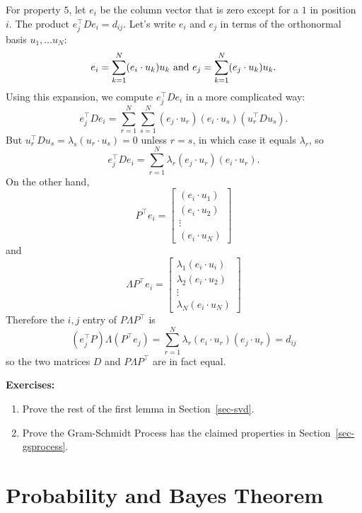 \documentclass[
  11pt,
  letterpaper,
]{scrbook}
\theoremstyle{plain}
\theoremstyle{plain}
\theoremstyle{remark}
\begin{document}
For property \(5\), let \(e_{i}\) be the column vector that is zero
except for a \(1\) in position \(i\). The product
\(e_{j}^{\intercal}De_{i}=d_{ij}\). Let's write \(e_{i}\) and \(e_{j}\)
in terms of the orthonormal basis \(u_{1},\ldots u_{N}\): \[
e_{i} = \sum_{k=1}^{N} (e_{i}\cdot u_{k})u_k \hbox{ and } e_{j} = \sum_{k=1}^{N}(e_{j}\cdot u_{k})u_{k}.
\] Using this expansion, we compute \(e_{j}^{\intercal}De_{i}\) in a
more complicated way: \[
e_{j}^{\intercal}De_{i} = \sum_{r=1}^{N}\sum_{s=1}^{N} (e_{j}\cdot u_{r})(e_{i}\cdot u_{s})(u_{r}^{\intercal}Du_{s}).
\] But \(u_{r}^{\intercal}Du_{s}=\lambda_{s}(u_{r}\cdot u_{s})=0\)
unless \(r=s\), in which case it equals \(\lambda_{r}\), so \[
e_{j}^{\intercal}De_{i} = \sum_{r=1}^{N} \lambda_{r}(e_{j}\cdot u_{r})(e_{i}\cdot u_{r}).
\] On the other hand, \[
P^{\intercal}e_{i} = \left[\begin{matrix} (e_{i}\cdot u_{1})\\ (e_{i}\cdot u_{2})\\ \vdots \\(e_{i}\cdot u_{N})\end{matrix}\right]
\] and \[
\Lambda P^{\intercal}e_{i} = \left[\begin{matrix} \lambda_{1}(e_{i}\cdot u_{i})\\ \lambda_{2}(e_{i}\cdot u_{2})\\ \vdots \\ \lambda_{N}(e_{i}\cdot u_{N})\end{matrix}\right]
\] Therefore the \(i,j\) entry of \(P\Lambda P^{\intercal}\) is \[
(e_{j}^{\intercal}P)\Lambda (P^{\intercal}e_{j}) = \sum_{r=1}^{N} \lambda_{r}(e_{i}\cdot u_{r})(e_{j}\cdot u_{r}) = d_{ij}
\] so the two matrices \(D\) and \(P\Lambda P^{\intercal}\) are in fact
equal.

\textbf{Exercises:}

\begin{enumerate}
\def\labelenumi{\arabic{enumi}.}
\item
  Prove the rest of the first lemma in Section~\ref{sec-svd}.
\item
  Prove the Gram-Schmidt Process has the claimed properties in
  Section~\ref{sec-gsprocess}.
\end{enumerate}


\hypertarget{probability-and-bayes-theorem}{%
\chapter{Probability and Bayes
Theorem}\label{probability-and-bayes-theorem}}
\end{document}
